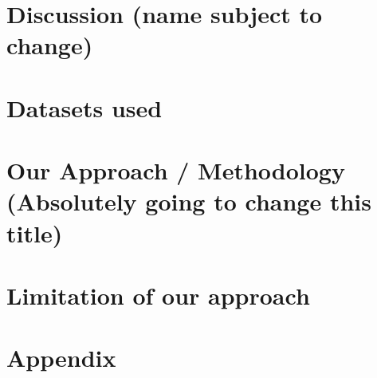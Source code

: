 \documentclass[oneside, a4paper, onecolumn, 11pt]{article}
\begin{document}
\section{Discussion (name subject to change)} %

\section{Datasets used}

\section{Our Approach / Methodology (Absolutely going to change this title)}

\section{Limitation of our approach}

\newpage
\nocite{*}



\newpage
\appendix

\section{Appendix}
\label{sec:appendix}
\end{document}
